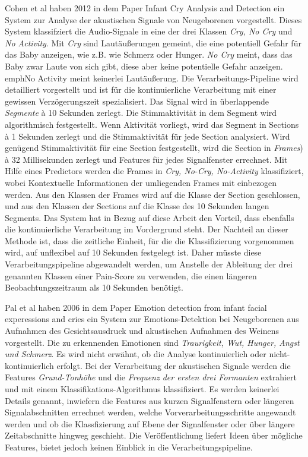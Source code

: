 Cohen et al haben 2012 in dem Paper \glqq Infant Cry Analysis and Detection \grqq{} \cite{cohenCry}  ein System zur Analyse der akustischen Signale von Neugeborenen vorgestellt. Dieses System klassifziert die Audio-Signale in eine der drei Klassen \emph{Cry, No Cry} und \emph{No Activity}. Mit \emph{Cry} sind Lautäußerungen gemeint, die eine potentiell Gefahr für das Baby anzeigen, wie z.B. wie Schmerz oder Hunger. \emph{No Cry} meint, dass das Baby zwar Laute von sich gibt, diese aber keine potentielle Gefahr anzeigen. emph{No Activity} meint keinerlei Lautäußerung. Die Verarbeitungs-Pipeline wird detailliert vorgestellt und ist für die kontinuierliche Verarbeitung mit einer gewissen Verzögerungszeit spezialisiert. Das Signal wird in überlappende \emph{Segmente} \`{a} 10 Sekunden zerlegt. Die Stimmaktivität in dem Segment wird algorithmisch festgestellt. Wenn Aktivität vorliegt, wird das Segment in Sections \`{a} 1 Sekunden zerlegt und die Stimmaktivität für jede Section analysiert. Wird genügend Stimmaktivität für eine Section festgestellt, wird die Section in \emph{Frames}) \`{a} 32 Millisekunden zerlegt und Features für jedes Signalfenster errechnet. Mit Hilfe eines Predictors werden die Frames in \emph{Cry, No-Cry, No-Activity} klassifiziert, wobei Kontextuelle Informationen der umliegenden Frames mit einbezogen werden. Aus den Klassen der Frames wird auf die Klasse der Section geschlossen, und aus den Klassen der Sections auf die Klasse des 10 Sekunden langen Segments. Das System hat in Bezug auf diese Arbeit den Vorteil, dass ebenfalls die kontinuierliche Verarbeitung im Vordergrund steht. Der Nachteil an dieser Methode ist, dass die zeitliche Einheit, für die die Klassifizierung vorgenommen wird, auf unflexibel auf 10 Sekunden festgelegt ist. Daher müsste diese Verarbeitungspipeline abgewandelt werden, um Anstelle der  Ableitung der drei genannten Klassen einer Pain-Score zu verwenden, die einen längeren Beobachtungszeitraum als 10 Sekunden benötigt.

Pal et al  haben 2006 in dem Paper \glqq Emotion detection from infant facial experessions and cries\grqq{} \cite{palEmotion} ein System zur Emotions-Detektion bei Neugeborenen aus Aufnahmen des Gesichtsausdruck und akustischen Aufnahmen des Weinens vorgestellt. Die zu erkennenden Emotionen sind \emph{Traurigkeit, Wut, Hunger, Angst und Schmerz}. Es wird nicht erwähnt, ob die Analyse kontinuierlich oder nicht-kontinuierlich erfolgt. Bei der Verarbeitung der akustischen Signale werden die Features \emph{Grund-Tonhöhe} und die \emph{Frequenz der ersten drei Formanten} extrahiert und mit einem Klassifikations-Algorithmus klassifiziert. Es werden keinerlei Details genannt, inwiefern die Features aus kurzen Signalfenstern oder längeren Signalabschnitten errechnet werden, welche Vorverarbeitungsschritte angewandt werden und ob die Klassfizierung auf Ebene der Signalfenster oder über längere Zeitabschnitte hingweg geschieht. Die Veröffentlichung liefert Ideen über mögliche Features, bietet jedoch keinen Einblick in die Verarbeitungspipeline.

